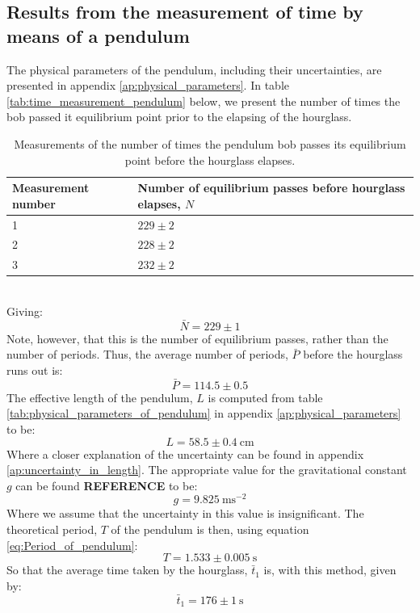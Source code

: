 \documentclass[a4paper, 10pt]{article}
\begin{document}
\subsection{Results from the measurement of time by means of a pendulum}\label{results_pendulum_length}
The physical parameters of the pendulum, including their uncertainties, are presented in appendix \ref{ap:physical_parameters}. In table \ref{tab:time_measurement_pendulum} below, we present the number of times the bob passed it equilibrium point prior to the elapsing of the hourglass.\\
\linebreak
\linebreak
\label{tab:time_measurement_pendulum}
\begin{table}[ht!]
\centering
\caption{Measurements of the number of times the pendulum bob passes its equilibrium point before the hourglass elapses.}
\begin{tabular}{|l|l|}
\hline
\textbf{Measurement number}                              & \textbf{Number of equilibrium passes before hourglass elapses, $N$}             \\
\hline
1                                  & $229\pm 2$  \\
2		                            & $228 \pm 2$    \\
3									 & $232 \pm 2$   \\

\hline 
\end{tabular}
\end{table}\\
Giving:
$$\bar{N}=229\pm 1$$
Note, however, that this is the number of equilibrium passes, rather than the number of periods. Thus, the average number of periods, $\bar{P}$ before the hourglass runs out is:
$$\bar{P}=114.5 \pm 0.5$$
The effective length of the pendulum, $L$ is computed from table \ref{tab:physical_parameters_of_pendulum} in appendix \ref{ap:physical_parameters} to be:
$$L=58.5 \pm 0.4 \ \mathrm{cm}$$
Where a closer explanation of the uncertainty can be found in appendix \ref{ap:uncertainty_in_length}. The appropriate value for the gravitational constant $g$ can be found \textbf{REFERENCE} to be:
$$g = 9.825\ \mathrm{m s^{-2}}$$
Where we assume that the uncertainty in this value is insignificant. 
The theoretical period, $T$ of the pendulum is then, using equation \ref{eq:Period_of_pendulum}:
$$T=1.533 \pm 0.005 \ \mathrm{s}$$
So that the average time taken by the hourglass, $\bar{t}_1$ is, with this method, given by:
$$\bar{t}_1=176 \pm 1\ \mathrm{s}$$
\end{document}
